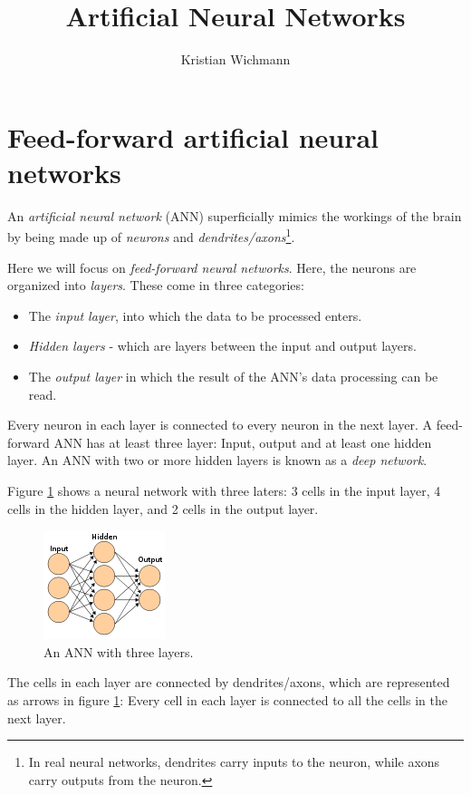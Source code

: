 \documentclass[12pt, a4paper]{article}
\title{Artificial Neural Networks}
\author{Kristian Wichmann}
\numberwithin{equation}{section}
\begin{document}
\maketitle

\section{Feed-forward artificial neural networks}
An \textit{artificial neural network} (ANN) superficially mimics the workings of the brain by being made up of \textit{neurons} and \textit{dendrites/axons}\footnote{In real neural networks, dendrites carry inputs to the neuron, while axons carry outputs from the neuron.}.

Here we will focus on \textit{feed-forward neural networks}. Here, the neurons are organized into \textit{layers}. These come in three categories:
\begin{itemize}
\item The \textit{input layer}, into which the data to be processed enters.
\item \textit{Hidden layers} - which are layers between the input and output layers.
\item The \textit{output layer} in which the result of the ANN's data processing can be read.
\end{itemize}

Every neuron in each layer is connected to every neuron in the next layer. A feed-forward ANN has at least three layer: Input, output and at least one hidden layer. An ANN with two or more hidden layers is known as a \textit{deep network}. 

Figure \ref{fig:ann_example} shows a neural network with three laters: 3 cells in the input layer, 4 cells in the hidden layer, and 2 cells in the output layer.

\begin{figure}
\centering
\includegraphics{artificial_neural_network}
\caption{An ANN with three layers.}
\label{fig:ann_example}
\end{figure}

The cells in each layer are connected by dendrites/axons, which are represented as arrows in figure \ref{fig:ann_example}: Every cell in each layer is connected to all the cells in the next layer.
\end{document}
